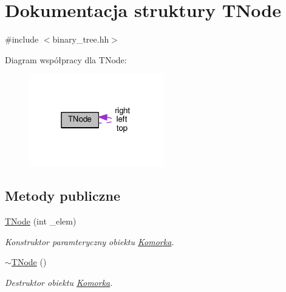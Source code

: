 \hypertarget{struct_t_node}{\section{Dokumentacja struktury T\-Node}
\label{struct_t_node}
}


{\ttfamily \#include $<$binary\-\_\-tree.\-hh$>$}



Diagram współpracy dla T\-Node\-:\nopagebreak
\begin{figure}[H]
\begin{center}
\leavevmode
\includegraphics[width=166pt]{struct_t_node__coll__graph}
\end{center}
\end{figure}
\subsection*{Metody publiczne}
\begin{DoxyCompactItemize}
\item 
\hyperlink{struct_t_node_a8681e0920f2e2ba9fab62fcb735b6c8b}{T\-Node} (int \-\_\-elem)
\begin{DoxyCompactList}\small\item\em Konstruktor paramteryczny obiektu \hyperlink{struct_komorka}{Komorka}. \end{DoxyCompactList}\item 
\hyperlink{struct_t_node_a374606795ee14fe9a6df10dec491d799}{$\sim$\-T\-Node} ()
\begin{DoxyCompactList}\small\item\em Destruktor obiektu \hyperlink{struct_komorka}{Komorka}. \end{DoxyCompactList}\end{DoxyCompactItemize}
